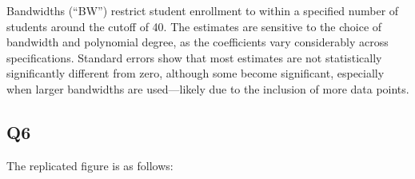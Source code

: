 \documentclass[
  letterpaper,
  DIV=11,
  numbers=noendperiod]{scrartcl}
\begin{document}
\clearpage

Bandwidths (``BW'') restrict student enrollment to within a specified
number of students around the cutoff of 40. The estimates are sensitive
to the choice of bandwidth and polynomial degree, as the coefficients
vary considerably across specifications. Standard errors show that most
estimates are not statistically significantly different from zero,
although some become significant, especially when larger bandwidths are
used---likely due to the inclusion of more data points.

\subsection{Q6}\label{q6}

The replicated figure is as follows:
\end{document}
